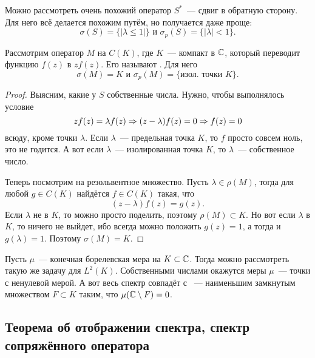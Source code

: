 \documentclass{notes}
\begin{document}
	\begin{exm}
		Можно рассмотреть очень похожий оператор $S^{*}$~--- сдвиг в обратную сторону. Для него всё делается похожим путём, но получается даже проще:
		\[
			\sigma(S) = \{|\lambda \leqslant 1|\} \text{ и } \sigma_p(S) = \{|\lambda| < 1\}.
		\]
	\end{exm}

	\begin{exm}
		Рассмотрим оператор $M$ на $C(K)$, где $K$~--- компакт в $\mathbb{C}$, который переводит функцию $f(z)$ в $zf(z)$. Его называют . Для него
		\[
			\sigma(M) = K \text{ и } \sigma_p(M) = \{\text{изол. точки } K\}.
		\]
		\begin{proof}
			Выясним, какие у $S$ собственные числа. Нужно, чтобы выполнялось условие
			\[
				zf(z) = \lambda f(z) \Rightarrow (z - \lambda) f(z) = 0 \Rightarrow f(z) = 0
			\]
			всюду, кроме точки $\lambda$. Если $\lambda$~--- предельная точка $K$, то $f$ просто совсем ноль, это не годится. А вот если $\lambda$~--- изолированная точка $K$, то $\lambda$~--- собственное число.

			Теперь посмотрим на резольвентное множество. Пусть $\lambda \in \rho(M)$, тогда для любой $g \in C(K)$ найдётся $f \in C(K)$ такая, что
			\[
				(z - \lambda) f(z) = g(z).
			\]
			Если $\lambda$ не в $K$, то можно просто поделить, поэтому $\rho(M) \subset K$. Но вот если $\lambda$ в $K$, то ничего не выйдет, ибо всегда можно положить $g(z) = 1$, а тогда и $g(\lambda) = 1$. Поэтому $\sigma(M) = K$.
		\end{proof}
	\end{exm}
	
	\begin{exm}
		Пусть $\mu$~--- конечная борелевская мера на $K \subset \mathbb{C}$. Тогда можно рассмотреть такую же задачу для $L^2(K)$. Собственными числами окажутся  меры $\mu$~--- точки с ненулевой мерой. А вот весь спектр совпадёт с ~--- наименьшим замкнутым множеством $F \subset K$ таким, что $\mu(\mathbb{C} \setminus F) = 0$.
	\end{exm}

\subsection{Теорема об отображении спектра, спектр сопряжённого оператора}
\end{document}
